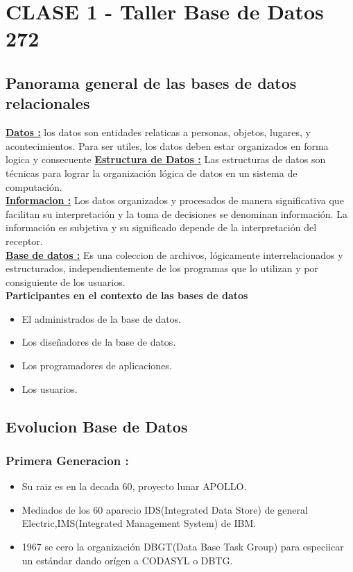 \documentclass{article}
\begin{document}
    \section*{CLASE 1 - Taller Base de Datos 272}
    \begin{multicols}{2}
        \subsection{Panorama general de las bases de datos relacionales}
        \underline{\textbf{Datos :}}
        los datos son entidades relaticas a personas, objetos, lugares, y acontecimientos.
        Para ser utiles, los datos deben estar organizados en forma logica y consecuente
        \underline{\textbf{Estructura de Datos :}}
        Las estructuras de datos son técnicas para lograr la organización lógica de datos en
        un sistema de computación.\\
        \underline{\textbf{Informacion :}}
        Los datos organizados y procesados de manera significativa que facilitan su
        interpretación y la toma de decisiones se denominan información.
        La información es subjetiva y su significado depende de la interpretación
        del receptor.\\
        \underline{\textbf{Base de datos :}}
        Es una coleccion de archivos, lógicamente interrelacionados y estructurados,
        independientemente de los programas que lo utilizan y por consiguiente de los 
        usuarios.\\

        \textbf{Participantes en el contexto de las bases de datos}
        \begin{itemize}
            \item El administrados de la base de datos.
            \item Los diseñadores de la base de datos.
            \item Los programadores de aplicaciones.
            \item Los usuarios.
        \end{itemize}
        \subsection{Evolucion Base de Datos}
        \subsubsection{Primera Generacion :}
        \begin{itemize}
            \item Su raiz es en la decada 60, proyecto lunar APOLLO.
            \item Mediados de los 60 aparecio IDS(Integrated Data Store) de general Electric,IMS(Integrated Management System) de IBM.
            \item 1967 se cero la organización DBGT(Data Base Task Group) para especiicar un estándar dando orígen a CODASYL o DBTG.
        \end{itemize}


\end{multicols}
\end{document}
